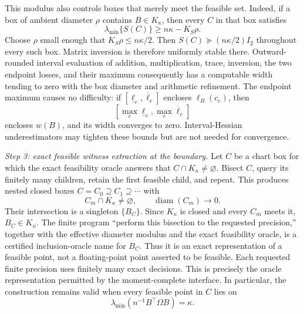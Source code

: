 This modulus also controls boxes that merely meet the feasible set.  Indeed, if a box of ambient diameter \(\rho\) contains \(B\in K_\kappa\), then every \(C\) in that box satisfies
\[
\lambda_{\min}\{S(C)\}
\ge n\kappa-K_S\rho.
\]
Choose \(\rho\) small enough that \(K_S\rho\le n\kappa/2\).  Then \(S(C)\succeq(n\kappa/2)I_2\) throughout every such box.  Matrix inversion is therefore uniformly stable there.  Outward-rounded interval evaluation of addition, multiplication, trace, inversion, the two endpoint losses, and their maximum consequently has a computable width tending to zero with the box diameter and arithmetic refinement.  The endpoint maximum causes no difficulty: if \([\underline\ell_e,\overline\ell_e]\) encloses \(\ell_B(c_e)\), then
\[
\left[
\max_e\underline\ell_e,
\max_e\overline\ell_e
\right]
\]
encloses \(w(B)\), and its width converges to zero.  Interval-Hessian underestimators may tighten these bounds but are not needed for convergence.

\emph{Step 3: exact feasible witness extraction at the boundary.}
Let \(C\) be a chart box for which the exact feasibility oracle answers that \(C\cap K_\kappa\ne\varnothing\).  Bisect \(C\), query its finitely many children, retain the first feasible child, and repeat.  This produces nested closed boxes \(C=C_0\supseteq C_1\supseteq\cdots\) with
\[
C_m\cap K_\kappa\ne\varnothing,
\qquad
\operatorname{diam}(C_m)\longrightarrow0.
\]
Their intersection is a singleton \(\{B_C\}\).  Since \(K_\kappa\) is closed and every \(C_m\) meets it, \(B_C\in K_\kappa\).  The finite program ``perform this bisection to the requested precision,'' together with the effective diameter modulus and the exact feasibility oracle, is a certified inclusion-oracle name for \(B_C\).  Thus it is an exact representation of a feasible point, not a floating-point point asserted to be feasible.  Each requested finite precision uses finitely many exact decisions.  This is precisely the oracle representation permitted by the moment-complete interface.  In particular, the construction remains valid when every feasible point in \(C\) lies on
\[
\lambda_{\min}\!\left(n^{-1}B^{\top}\Omega B\right)=\kappa.
\]

